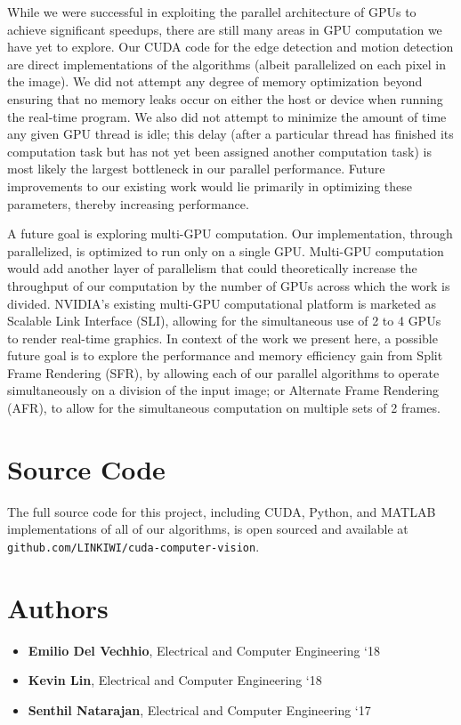 \documentclass[journal]{IEEEtran}
\begin{document}
\par While we were successful in exploiting the parallel architecture of GPUs to achieve significant speedups, there are still many areas in GPU computation we have yet to explore. Our CUDA code for the edge detection and motion detection are direct implementations of the algorithms (albeit parallelized on each pixel in the image). We did not attempt any degree of memory optimization beyond ensuring that no memory leaks occur on either the host or device when running the real-time program. We also did not attempt to minimize the amount of time any given GPU thread is idle; this delay (after a particular thread has finished its computation task but has not yet been assigned another computation task) is most likely the largest bottleneck in our parallel performance. Future improvements to our existing work would lie primarily in optimizing these parameters, thereby increasing performance.
\par A future goal is exploring multi-GPU computation. Our implementation, through parallelized, is optimized to run only on a single GPU. Multi-GPU computation would add another layer of parallelism that could theoretically increase the throughput of our computation by the number of GPUs across which the work is divided. NVIDIA's existing multi-GPU computational platform is marketed as Scalable Link Interface (SLI), allowing for the simultaneous use of 2 to 4 GPUs to render real-time graphics. In context of the work we present here, a possible future goal is to explore the performance and memory efficiency gain from Split Frame Rendering (SFR), by allowing each of our parallel algorithms to operate simultaneously on a division of the input image; or Alternate Frame Rendering (AFR), to allow for the simultaneous computation on multiple sets of 2 frames.

\section*{Source Code}
The full source code for this project, including CUDA, Python, and MATLAB implementations of all of our algorithms, is open sourced and available at \texttt{github.com/LINKIWI/cuda-computer-vision}.

\section*{Authors}
\begin{itemize}
	\item \textbf{Emilio Del Vechhio}, Electrical and Computer Engineering `18
	\item \textbf{Kevin Lin}, Electrical and Computer Engineering `18
	\item \textbf{Senthil Natarajan}, Electrical and Computer Engineering `17
\end{itemize}
\end{document}
